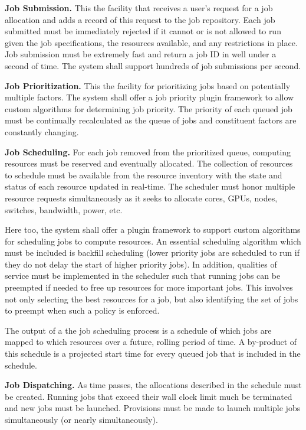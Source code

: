 \textbf{Job Submission.} This the facility that receives a user's
request for a job allocation and adds a record of this request to
the job repository.  Each job submitted must be immediately rejected
if it cannot or is not allowed to run given the job specifications,
the resources available, and any restrictions in place.  Job
submission must be extremely fast and return a job ID in well under a
second of time.  The system shall support hundreds of job submissions
per second.

\textbf{Job Prioritization.}  This the facility for prioritizing jobs
based on potentially multiple factors.  The system shall offer a job
priority plugin framework to allow custom algorithms for determining
job priority.  The priority of each queued job must be continually
recalculated as the queue of jobs and constituent factors are
constantly changing.

\textbf{Job Scheduling.} For each job removed from the prioritized
queue, computing resources must be reserved and eventually allocated.
The collection of resources to schedule must be available from the
resource inventory with the state and status of each resource updated in
real-time.  The scheduler must honor multiple resource requests
simultaneously as it seeks to allocate cores, GPUs, nodes, switches,
bandwidth, power, etc.

Here too, the system shall offer a plugin framework to support custom
algorithms for scheduling jobs to compute resources.  An essential
scheduling algorithm which must be included is backfill scheduling
(lower priority jobs are scheduled to run if they do not delay the
start of higher priority jobs).  In addition, qualities of service must
be implemented in the scheduler such that running jobs can be
preempted if needed to free up resources for more important jobs.
This involves not only selecting the best resources for a job, but
also identifying the set of jobs to preempt when such a policy is
enforced.

The output of a the job scheduling process is a schedule of which jobs
are mapped to which resources over a future, rolling period of time.
A by-product of this schedule is a projected start time for every
queued job that is included in the schedule.

\textbf{Job Dispatching.} As time passes, the allocations described in
the schedule must be created.  Running jobs that exceed their wall
clock limit much be terminated and new jobs must be launched.
Provisions must be made to launch multiple jobs simultaneously (or
nearly simultaneously).

